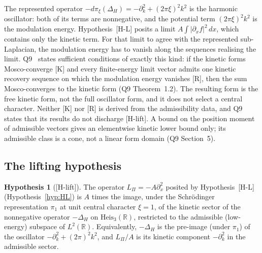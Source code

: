 \documentclass[11pt,a4paper]{article}
\theoremstyle{definition}
\newtheorem{hypothesis}[theorem]{Hypothesis}
\theoremstyle{remark}
\newcommand{\HeisR}{\mathrm{Heis}_3(\mathbb{R})}
\newcommand{\DeltaH}{\Delta_H}
\newcommand{\LPi}{L_\Pi}
\begin{document}
    The represented operator $-d\pi_\xi(\DeltaH) = -\partial_k^2 + (2\pi\xi)^2 k^2$ is the harmonic oscillator:
    both of its terms are nonnegative, and the potential term $(2\pi\xi)^2 k^2$ is the modulation energy.
    Hypothesis~[H-L] posits a limit $A\int |\partial_x f|^2\,dx$, which contains only the kinetic term.
    For that limit to agree with the represented sub-Laplacian, the modulation energy has to vanish along the
    sequences realising the limit.
    Q9~\cite{Beau2026q9} states sufficient conditions of exactly this kind: if the kinetic forms Mosco-converge [K]
    and every finite-energy limit vector admits one kinetic recovery sequence on which the modulation energy
    vanishes [R], then the sum Mosco-converges to the kinetic form (Q9 Theorem~1.2).
    The resulting form is the free kinetic form, not the full oscillator form, and it does not select a central
    character.
    Neither [K] nor [R] is derived from the admissibility data, and Q9 states that its results do not discharge
    [H-lift].
    A bound on the position moment of admissible vectors gives an elementwise kinetic lower bound only; its
    admissible class is a cone, not a linear form domain (Q9 Section~5).

  \subsection{The lifting hypothesis}
    \label{ssec:hlift}

    \begin{hypothesis}[{[H-lift]}]
      \label{hyp:lift}
      The operator $\LPi = -A\partial_x^2$ posited by Hypothesis~[H-L]
      (Hypothesis~\ref{hyp:HL}) is $A$ times the image, under the Schr\"{o}dinger representation
      $\pi_1$ at unit central character $\xi = 1$, of the kinetic sector of the nonnegative operator $-\DeltaH$ on
      $\HeisR$, restricted to the admissible (low-energy) subspace of $L^2(\mathbb{R})$.
      Equivalently, $-\DeltaH$ is the pre-image (under $\pi_1$) of the oscillator $-\partial_k^2 + (2\pi)^2 k^2$,
      and $\LPi/A$ is its kinetic component $-\partial_k^2$ in the admissible sector.
    \end{hypothesis}
\end{document}
